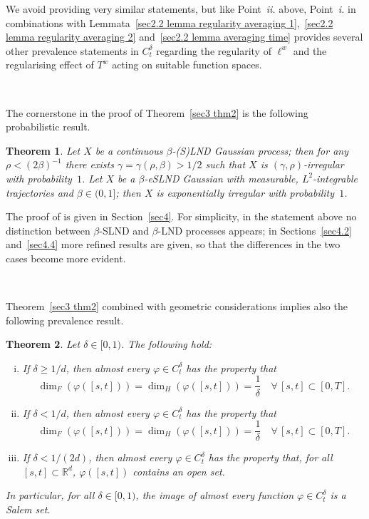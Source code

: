 \documentclass[10pt]{article}
\newcommand{\tmtextit}[1]{{\itshape{#1}}}
\newenvironment{enumerateroman}{\begin{enumerate}[i.] }{\end{enumerate}}
\newtheorem{theorem}{Theorem}
\begin{document}
We avoid providing very similar statements, but like Point~\tmtextit{ii.}
above, Point~\tmtextit{i.} in combinations with Lemmata~\ref{sec2.2 lemma
regularity averaging 1},~\ref{sec2.2 lemma regularity averaging 2}
and~\ref{sec2.2 lemma averaging time} provides several other prevalence
statements in $C^{\delta}_t$ regarding the regularity of $\ell^w$ and the
regularising effect of $T^w$ acting on suitable function spaces.

\

The cornerstone in the proof of Theorem~\ref{sec3 thm2} is the following
probabilistic result.

\begin{theorem}
  \label{sec3 thm1}Let $X$ be a continuous $\beta$\mbox{-}(S)LND Gaussian
  process; then for any $\rho < (2 \beta)^{- 1}$ there exists $\gamma = \gamma
  (\rho, \beta) > 1 / 2$ such that $X$ is $(\gamma, \rho)$-irregular with
  probability~$1$. Let $X$ be a $\beta$\mbox{-}eSLND Gaussian with measurable,
  $L^2$\mbox{-}integrable trajectories and $\beta \in (0, 1]$; then $X$ is
  exponentially irregular with probability~$1$.
\end{theorem}

The proof of is given in Section~\ref{sec4}. For simplicity, in the statement
above no distinction between $\beta$\mbox{-}SLND and $\beta$\mbox{-}LND
processes appears; in Sections~\ref{sec4.2} and~\ref{sec4.4} more refined
results are given, so that the differences in the two cases become more
evident.

\

Theorem~\ref{sec3 thm2} combined with geometric considerations implies also
the following prevalence result.

\begin{theorem}
  \label{sec3 thm4}Let $\delta \in [0, 1)$. The following hold:
  \begin{enumerateroman}
    \item If $\delta \geqslant 1 / d$, then almost every $\varphi \in
    C^{\delta}_t$ has the property that
    \[ \dim_F (\varphi ([s, t])) = \dim_H (\varphi ([s, t])) =
       \frac{1}{\delta} \quad \forall \, [s, t] \subset [0, T] . \]
    \item If $\delta < 1 / d$, then almost every $\varphi \in C^{\delta}_t$
    has the property that
    \[ \dim_F (\varphi ([s, t])) = \dim_H (\varphi ([s, t])) =
       \frac{1}{\delta} \quad \forall \, [s, t] \subset [0, T] . \]
    \item If $\delta < 1 / (2 d)$, then almost every $\varphi \in
    C^{\delta}_t$ has the property that, for all $[s, t] \subset
    \mathbb{R}^d$, $\varphi ([s, t])$ contains an open set.
  \end{enumerateroman}
  In particular, for all $\delta \in [0, 1)$, the image of almost every
  function $\varphi \in C^{\delta}_t$ is a Salem set.
\end{theorem}
\end{document}
